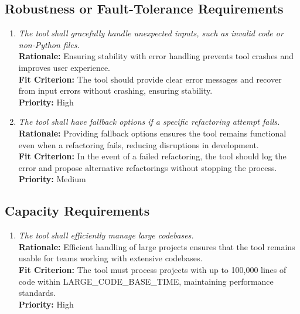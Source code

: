 \documentclass[12pt]{article}
\begin{document}
\subsection{Robustness or Fault-Tolerance Requirements}
\begin{enumerate}[label=PR-RFT \arabic*., wide=0pt, leftmargin=*]
  \item \emph{The tool shall gracefully handle unexpected inputs,
    such as invalid code or non-Python files.}\\[2mm]
    {\bf Rationale:} Ensuring stability with error handling prevents
    tool crashes and improves user experience.\\
    {\bf Fit Criterion:} The tool should provide clear error messages
    and recover from input errors without crashing, ensuring stability.\\
    {\bf Priority:} High
  \item \emph{The tool shall have fallback options if a specific
    refactoring attempt fails.}\\[2mm]
    {\bf Rationale:} Providing fallback options ensures the tool
    remains functional even when a refactoring fails, reducing
    disruptions in development.\\
    {\bf Fit Criterion:} In the event of a failed refactoring, the
    tool should log the error and propose alternative refactorings
    without stopping the process.\\
    {\bf Priority:} Medium
\end{enumerate}

\subsection{Capacity Requirements}
\begin{enumerate}[label=PR-CR \arabic*., wide=0pt, leftmargin=*]
  \item \emph{The tool shall efficiently manage large codebases.}\\[2mm]
    {\bf Rationale:} Efficient handling of large projects ensures
    that the tool remains usable for teams working with extensive codebases.\\
    {\bf Fit Criterion:} The tool must process projects with up to
    100,000 lines of code within LARGE\_CODE\_BASE\_TIME, maintaining
    performance standards.\\
    {\bf Priority:} High
\end{enumerate}
\end{document}
